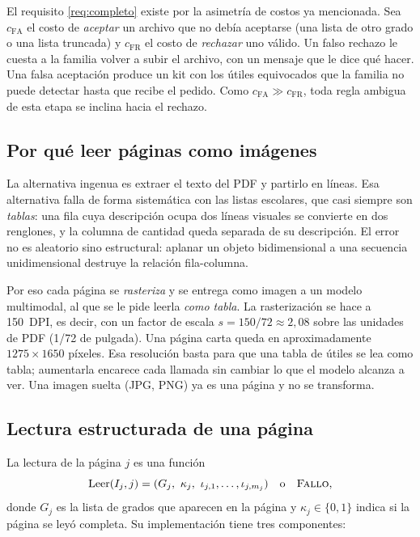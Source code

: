 El requisito \ref{req:completo} existe por la asimetría de costos ya
mencionada. Sea $c_{\mathrm{FA}}$ el costo de \emph{aceptar} un archivo que no
debía aceptarse (una lista de otro grado o una lista truncada) y
$c_{\mathrm{FR}}$ el costo de \emph{rechazar} uno válido. Un falso rechazo le
cuesta a la familia volver a subir el archivo, con un mensaje que le dice qué
hacer. Una falsa aceptación produce un kit con los útiles equivocados que la
familia no puede detectar hasta que recibe el pedido. Como
$c_{\mathrm{FA}}\gg c_{\mathrm{FR}}$, toda regla ambigua de esta etapa se
inclina hacia el rechazo.

\subsection{Por qué leer páginas como imágenes}

La alternativa ingenua es extraer el texto del PDF y partirlo en líneas. Esa
alternativa falla de forma sistemática con las listas escolares, que casi
siempre son \emph{tablas}: una fila cuya descripción ocupa dos líneas
visuales se convierte en dos renglones, y la columna de cantidad queda
separada de su descripción. El error no es aleatorio sino estructural: aplanar
un objeto bidimensional a una secuencia unidimensional destruye la relación
fila-columna.

Por eso cada página se \emph{rasteriza} y se entrega como imagen a un modelo
multimodal, al que se le pide leerla \emph{como tabla}. La rasterización se
hace a 150~DPI, es decir, con un factor de escala $s=150/72\approx 2{,}08$
sobre las unidades de PDF (1/72 de pulgada). Una página carta queda en
aproximadamente $1275\times 1650$ píxeles. Esa resolución basta para que una
tabla de útiles se lea como tabla; aumentarla encarece cada llamada sin
cambiar lo que el modelo alcanza a ver. Una imagen suelta (JPG, PNG) ya es una
página y no se transforma.

\subsection{Lectura estructurada de una página}
\label{sec:per-lectura}

La lectura de la página $j$ es una función
\[
  \mathrm{Leer}(I_j, j) = (G_j,\ \kappa_j,\ \iota_{j,1},\dots,\iota_{j,m_j})
  \quad\text{o}\quad \textsc{Fallo},
\]
donde $G_j$ es la lista de grados que aparecen en la página y
$\kappa_j\in\{0,1\}$ indica si la página se leyó completa. Su implementación
tiene tres componentes:


